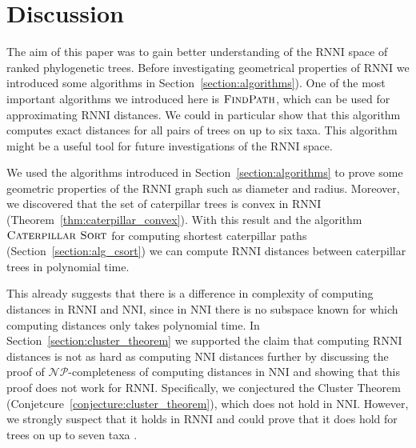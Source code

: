 \documentclass{amsart}
\newcommand{\np}{\mathcal{NP}}
\newcommand{\nni}{\mathrm{NNI}}
\newcommand{\rnni}{\mathrm{RNNI}}
\newcommand{\csort}{\textsc{Caterpillar Sort}}
\newcommand{\findpath}{\textsc{FindPath}}
\newtheorem{theorem}[definition]{Theorem}
\begin{document}
%
%
%
%
%

\section{Discussion}

The aim of this paper was to gain better understanding of the $\rnni$ space of ranked phylogenetic trees.
Before investigating geometrical properties of $\rnni$ we introduced some algorithms in Section~\ref{section:algorithms}).
One of the most important algorithms we introduced here is $\findpath$, which can be used for approximating $\rnni$ distances.
We could in particular show that this algorithm computes exact distances for all pairs of trees on up to six taxa.
This algorithm might be a useful tool for future investigations of the $\rnni$ space.

We used the algorithms introduced in Section~\ref{section:algorithms} to prove some geometric properties of the $\rnni$ graph such as diameter and radius.
Moreover, we discovered that the set of caterpillar trees is convex in $\rnni$ (Theorem~\ref{thm:caterpillar_convex}).
With this result and the algorithm $\csort$ for computing shortest caterpillar paths (Section~\ref{section:alg_csort}) we can compute $\rnni$ distances between caterpillar trees in polynomial time.

This already suggests that there is a difference in complexity of computing distances in $\rnni$ and $\nni$, since in $\nni$ there is no subspace known for which computing distances only takes polynomial time.
In Section~\ref{section:cluster_theorem} we supported the claim that computing $\rnni$ distances is not as hard as computing $\nni$ distances further by discussing the proof of $\np$-completeness of computing distances in $\nni$ and showing that this proof does not work for $\rnni$.
Specifically, we conjectured the Cluster Theorem (Conjetcure~\ref{conjecture:cluster_theorem}), which does not hold in $\nni$.
However, we strongly suspect that it holds in $\rnni$ and could prove that it does hold for trees on up to seven taxa \autocite{Collienne2019}.
\end{document}
